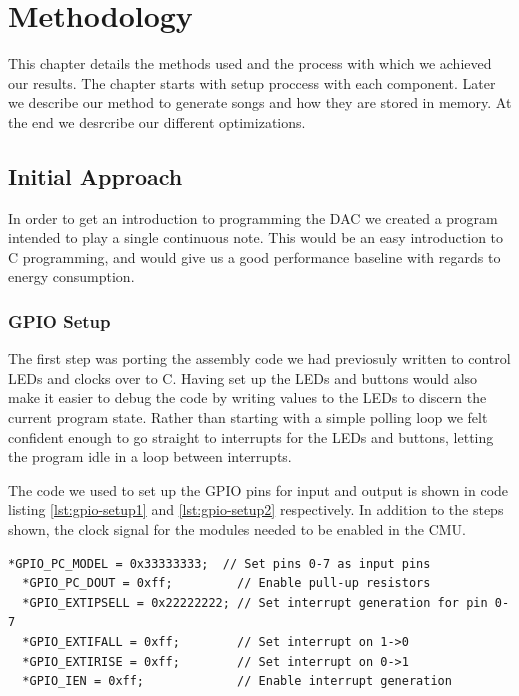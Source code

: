 \chapter{Methodology}
This chapter details the methods used and the process with which we achieved our results. The chapter starts with setup proccess with each component. Later we describe our method to generate songs and how they are stored in memory. At the end we desrcribe our different optimizations.

\section{Initial Approach}
In order to get an introduction to programming the DAC we created a program intended to play a single continuous note. This would be an easy introduction to C programming, and would give us a good performance baseline with regards to energy consumption.

\subsection{GPIO Setup} 
The first step was porting the assembly code we had previosuly written to control LEDs and clocks over to C. Having set up the LEDs and buttons would also make it easier to debug the code by writing values to the LEDs to discern the current program state. Rather than starting with a simple polling loop we felt confident enough to go straight to interrupts for the LEDs and buttons, letting the program idle in a loop between interrupts.

The code we used to set up the GPIO pins for input and output is shown in code listing \ref{lst:gpio-setup1} and \ref{lst:gpio-setup2} respectively. In addition to the steps shown, the clock signal for the modules needed to be enabled in the CMU. \\

\noindent\begin{minipage}[pos=c,contentpos=c]{\textwidth}
  \begin{lstlisting}[caption=Setting GPIO pins 0-7 as input,label={lst:gpio-setup1}]
  *GPIO_PC_MODEL = 0x33333333;  // Set pins 0-7 as input pins
  *GPIO_PC_DOUT = 0xff;         // Enable pull-up resistors
  *GPIO_EXTIPSELL = 0x22222222; // Set interrupt generation for pin 0-7
  *GPIO_EXTIFALL = 0xff;        // Set interrupt on 1->0
  *GPIO_EXTIRISE = 0xff;        // Set interrupt on 0->1
  *GPIO_IEN = 0xff;             // Enable interrupt generation
  \end{lstlisting}
\end{minipage}

